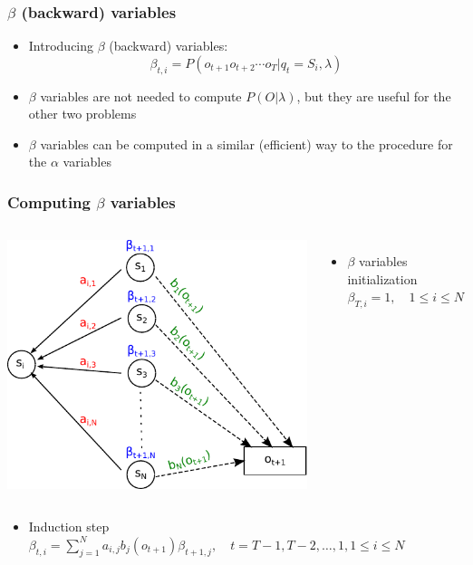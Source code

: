 \begin{frame}
  \frametitle{$\beta$ (backward) variables}
  \begin{itemize}
  \item Introducing $\beta$ (backward) variables:
    \begin{equation}
      \label{eq:beta}
      \beta_{t,i}=P(o_{t+1} o_{t+2} \cdots o_{T} \vert q_t = S_i, \lambda)
    \end{equation}
    \vspace*{1em} \pause
  \item $\beta$ variables are not needed to compute $P(O \vert
    \lambda)$, but they are useful for the other two problems
  \item $\beta$ variables can be computed in a similar (efficient) way
    to the procedure for the $\alpha$ variables
  \end{itemize}
\end{frame}

\begin{frame}
  \frametitle{Computing $\beta$ variables}
  \begin{columns}[B]
    \includegraphics[width=\textwidth]{graphics/backward.pdf}
    \begin{itemize}
    \item $\beta$ variables initialization \\
      $\beta_{T,i}=1,\quad 1 \le i \le N$
    \end{itemize}
  \end{columns}
  \begin{itemize}
  \item Induction step \\
    $\beta_{t,i}=\displaystyle\sum_{j=1}^{N}a_{i,j}b_j(o_{t+1})\beta_{t+1,j},
    \quad t = T-1, T-2, \ldots , 1, 1 \le i \le N$
  \end{itemize}
\end{frame}


